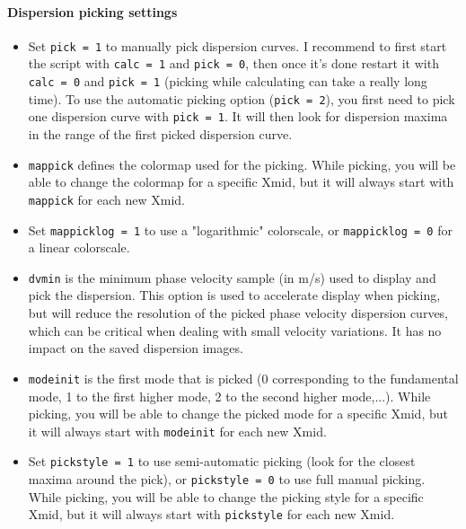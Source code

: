 \documentclass[twoside,a4paper]{article}
\begin{document}
\paragraph{Dispersion picking settings}
\begin{itemize}
\setlength\itemsep{2ex}
\setlength{\parindent}{5ex}

\item Set \verb|pick = 1| to manually pick dispersion curves. I recommend to first start the script with \verb|calc = 1| and \verb|pick = 0|, then once it's done restart it with \verb|calc = 0| and \verb|pick = 1| (picking while calculating can take a really long time). To use the automatic picking option (\verb|pick = 2|), you first need to pick one dispersion curve with \verb|pick = 1|. It will then look for dispersion maxima in the range of the first picked dispersion curve.

\item \verb|mappick| defines the colormap used for the picking. While picking, you will be able to change the colormap for a specific Xmid, but it will always start with \verb|mappick| for each new Xmid.

\item Set \verb|mappicklog = 1| to use a "logarithmic" colorscale, or \verb|mappicklog = 0| for a linear colorscale.

\item \verb|dvmin| is the minimum phase velocity sample (in m/s) used to display and pick the dispersion. This option is used to accelerate display when picking, but will reduce the resolution of the picked phase velocity dispersion curves, which can be critical when dealing with small velocity variations. It has no impact on the saved dispersion images.

\item \verb|modeinit| is the first mode that is picked (0 corresponding to the fundamental mode, 1 to the first higher mode, 2 to the second higher mode,...). While picking, you will be able to change the picked mode for a specific Xmid, but it will always start with \verb|modeinit| for each new Xmid.

\item Set \verb|pickstyle = 1| to use semi-automatic picking (look for the closest maxima around the pick), or \verb|pickstyle = 0| to use full manual picking. While picking, you will be able to change the picking style for a specific Xmid, but it will always start with \verb|pickstyle| for each new Xmid.


\end{itemize}
\end{document}

